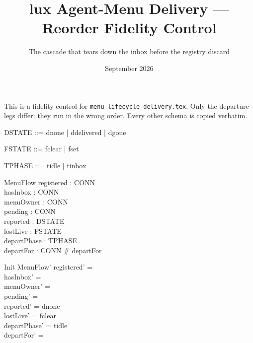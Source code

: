 \documentclass[a4paper,10pt,fleqn]{article}
\begin{document}
\title{lux Agent-Menu Delivery --- Reorder Fidelity Control}
\author{The cascade that tears down the inbox before the registry discard}
\date{September 2026}
\maketitle

This is a fidelity control for \texttt{menu\_lifecycle\_delivery.tex}. Only the
departure legs differ: they run in the wrong order. Every other schema is
copied verbatim.

\begin{zed}
  [CONN]
\end{zed}

\begin{zed}
  DSTATE ::= dnone | ddelivered | dgone
\end{zed}

\begin{zed}
  FSTATE ::= fclear | fset
\end{zed}

\begin{zed}
  TPHASE ::= tidle | tinbox
\end{zed}

\begin{schema}{MenuFlow}
  registered : \power CONN \\
  hasInbox : \power CONN \\
  menuOwner : \power CONN \\
  pending : \power CONN \\
  reported : DSTATE \\
  lostLive : FSTATE \\
  departPhase : TPHASE \\
  departFor : \power CONN
\where
  \# departFor 
\end{schema}

\begin{schema}{Init}
  MenuFlow'
\where
  registered' = \emptyset \\
  hasInbox' = \emptyset \\
  menuOwner' = \emptyset \\
  pending' = \emptyset \\
  reported' = dnone \\
  lostLive' = fclear \\
  departPhase' = tidle \\
  departFor' = \emptyset
\end{schema}
\end{document}
